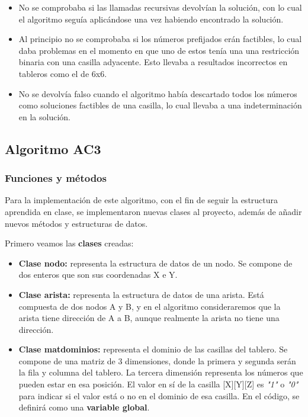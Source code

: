 \documentclass[12pt]{article}
\begin{document}
\begin{itemize}
    \item No se comprobaba si las llamadas recursivas devolvían la solución, con lo cual el algoritmo seguía aplicándose 
    una vez habiendo encontrado la solución.

    \item Al principio no se comprobaba si los números prefijados erán factibles, lo cual daba problemas en el momento 
    en que uno de estos tenía una una restricción binaria con una casilla adyacente. Esto llevaba a resultados incorrectos en 
    tableros como el de 6x6.

    \item No se devolvía falso cuando el algoritmo había descartado todos los números como soluciones factibles de una casilla, lo 
    cual llevaba a una indeterminación en la solución.
\end{itemize}

\subsection{Algoritmo AC3}

\subsubsection{Funciones y métodos}\label{ch:eisitris}

Para la implementación de este algoritmo, con el fin de seguir la estructura aprendida en clase, se implementaron 
nuevas clases al proyecto, además de añadir nuevos métodos y estructuras de datos.

Primero veamos las \textbf{clases} creadas:

\begin{itemize}
    \item \textbf{Clase nodo:} representa la estructura de datos de un nodo. Se compone de dos enteros que son
    sus coordenadas X e Y.
    \item \textbf{Clase arista:} representa la estructura de datos de una arista. Está compuesta de dos nodos A y B, y
    en el algoritmo consideraremos que la arista tiene dirección de A a B, aunque realmente la arista no tiene una dirección.
    
    \item \textbf{Clase matdominios:} representa el dominio de las casillas del tablero. Se compone de una matriz de 3 dimensiones, 
    donde la primera y segunda serán la fila y columna del tablero. La tercera dimensión representa los números que pueden estar en 
    esa posición. El valor en sí de la casilla [X][Y][Z] es \textit{"1"} o \textit{"0"} para indicar si el valor está o no en el dominio de esa casilla.
    En el código, se definirá como una \textbf{variable global}.
\end{itemize}
\end{document}
